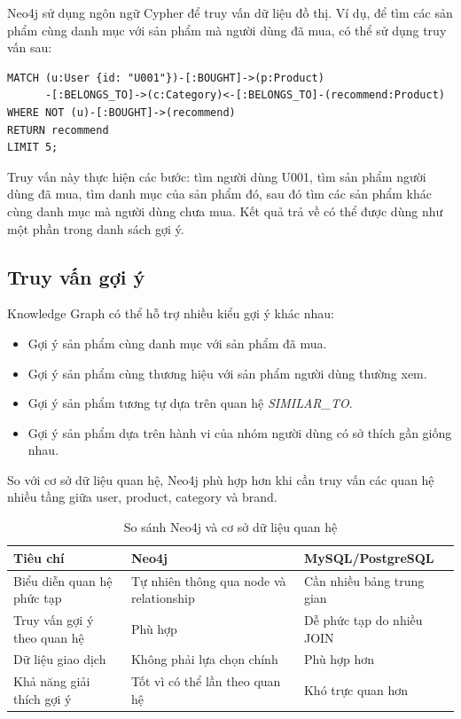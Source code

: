 \documentclass[../main.tex]{subfiles}
\begin{document}
Neo4j sử dụng ngôn ngữ Cypher để truy vấn dữ liệu đồ thị. Ví dụ, để tìm các sản phẩm cùng danh mục với sản phẩm mà người dùng đã mua, có thể sử dụng truy vấn sau:

\begin{verbatim}
MATCH (u:User {id: "U001"})-[:BOUGHT]->(p:Product)
      -[:BELONGS_TO]->(c:Category)<-[:BELONGS_TO]-(recommend:Product)
WHERE NOT (u)-[:BOUGHT]->(recommend)
RETURN recommend
LIMIT 5;
\end{verbatim}

Truy vấn này thực hiện các bước: tìm người dùng U001, tìm sản phẩm người dùng đã mua, tìm danh mục của sản phẩm đó, sau đó tìm các sản phẩm khác cùng danh mục mà người dùng chưa mua. Kết quả trả về có thể được dùng như một phần trong danh sách gợi ý.

\subsection{Truy vấn gợi ý}

Knowledge Graph có thể hỗ trợ nhiều kiểu gợi ý khác nhau:

\begin{itemize}
    \item Gợi ý sản phẩm cùng danh mục với sản phẩm đã mua.
    \item Gợi ý sản phẩm cùng thương hiệu với sản phẩm người dùng thường xem.
    \item Gợi ý sản phẩm tương tự dựa trên quan hệ \textit{SIMILAR\_TO}.
    \item Gợi ý sản phẩm dựa trên hành vi của nhóm người dùng có sở thích gần giống nhau.
\end{itemize}

So với cơ sở dữ liệu quan hệ, Neo4j phù hợp hơn khi cần truy vấn các quan hệ nhiều tầng giữa user, product, category và brand.

\begin{table}[H]
    \centering
    \caption{So sánh Neo4j và cơ sở dữ liệu quan hệ}
    \label{tab:chapter3-neo4j-comparison}
    \begin{tabular}{|p{}|p{}|p{}|}
        \hline
        \rowcolor{primary!35}
        \textbf{Tiêu chí} & \textbf{Neo4j} & \textbf{MySQL/PostgreSQL} \\
\hline
Biểu diễn quan hệ phức tạp & Tự nhiên thông qua node và relationship & Cần nhiều bảng trung gian \\
\hline
Truy vấn gợi ý theo quan hệ & Phù hợp & Dễ phức tạp do nhiều JOIN \\
\hline
Dữ liệu giao dịch & Không phải lựa chọn chính & Phù hợp hơn \\
\hline
Khả năng giải thích gợi ý & Tốt vì có thể lần theo quan hệ & Khó trực quan hơn \\
\hline
\end{tabular}
\end{table}
\end{document}
